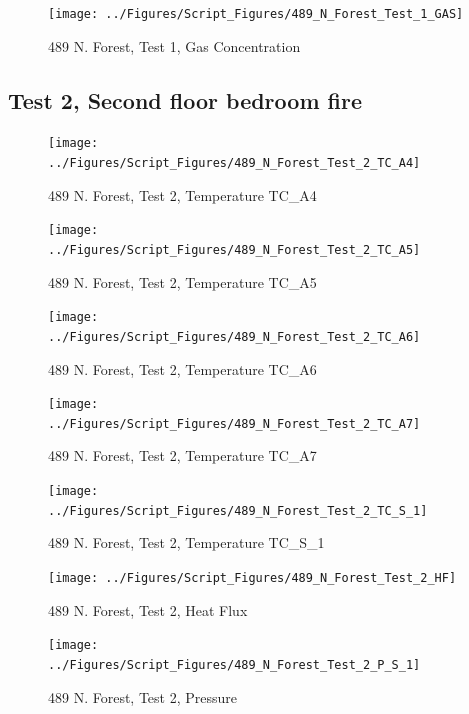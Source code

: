 \documentclass[12pt,oneside]{book}
\begin{document}
\begin{figure}[!ht]
\texttt{[image: ../Figures/Script\_Figures/489\_N\_Forest\_Test\_1\_GAS]}
\caption{489 N. Forest, Test 1, Gas Concentration}
\label{fig:489_N_Forest_Test_1_GAS}
\end{figure}


\clearpage

\subsection{Test 2, Second floor bedroom fire}



\begin{figure}[!ht]
\texttt{[image: ../Figures/Script\_Figures/489\_N\_Forest\_Test\_2\_TC\_A4]}
\caption{489 N. Forest, Test 2, Temperature TC\_A4}
\label{fig:489_N_Forest_Test_2_TC_A4}
\end{figure}

\begin{figure}[!ht]
\texttt{[image: ../Figures/Script\_Figures/489\_N\_Forest\_Test\_2\_TC\_A5]}
\caption{489 N. Forest, Test 2, Temperature TC\_A5}
\label{fig:489_N_Forest_Test_2_TC_A5}
\end{figure}

\begin{figure}[!ht]
\texttt{[image: ../Figures/Script\_Figures/489\_N\_Forest\_Test\_2\_TC\_A6]}
\caption{489 N. Forest, Test 2, Temperature TC\_A6}
\label{fig:489_N_Forest_Test_2_TC_A6}
\end{figure}

\begin{figure}[!ht]
\texttt{[image: ../Figures/Script\_Figures/489\_N\_Forest\_Test\_2\_TC\_A7]}
\caption{489 N. Forest, Test 2, Temperature TC\_A7}
\label{fig:489_N_Forest_Test_2_TC_A7}
\end{figure}

\begin{figure}[!ht]
\texttt{[image: ../Figures/Script\_Figures/489\_N\_Forest\_Test\_2\_TC\_S\_1]}
\caption{489 N. Forest, Test 2, Temperature TC\_S\_1}
\label{fig:489_N_Forest_Test_2_TC_S_1}
\end{figure}

\begin{figure}[!ht]
\texttt{[image: ../Figures/Script\_Figures/489\_N\_Forest\_Test\_2\_HF]}
\caption{489 N. Forest, Test 2, Heat Flux}
\label{fig:489_N_Forest_Test_2_HF}
\end{figure}

\begin{figure}[!ht]
\texttt{[image: ../Figures/Script\_Figures/489\_N\_Forest\_Test\_2\_P\_S\_1]}
\caption{489 N. Forest, Test 2, Pressure}
\label{fig:489_N_Forest_Test_2_P_S_1}
\end{figure}
\end{document}
